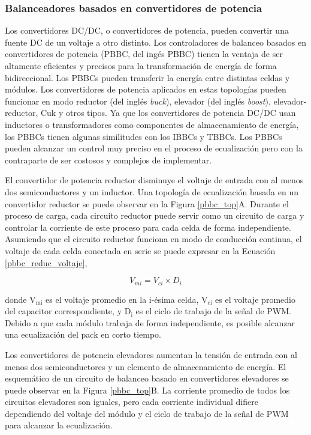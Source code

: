 \subsubsection{Balanceadores basados en convertidores de potencia}

Los convertidores DC/DC, o convertidores de potencia, pueden convertir una fuente
DC de un voltaje a otro distinto. Los controladores de balanceo basados en
convertidores de potencia (\acrshort{PBBC}, del ing\'es \acrlong{PBBC}) tienen
la ventaja de ser altamente eficientes y precisos para la transformaci\'on de
energ\'ia de forma bidireccional. Los \acrshort{PBBC}s pueden transferir la
energ\'ia entre distintas celdas y m\'odulos. Los convertidores de potencia
aplicados en estas topolog\'ias pueden funcionar en modo reductor (del ingl\'es
\emph{buck}), elevador (del ingl\'es \emph{boost}), elevador-reductor, Cuk y
otros tipos. Ya que los convertidores de potencia DC/DC usan inductores o
transformadores como componentes de almacenamiento de energ\'ia, los
\acrshort{PBBC}s tienen algunas similitudes con los \acrshort{IBBC}s y
\acrshort{TBBC}s. Los \acrshort{PBBC}s pueden alcanzar un control muy preciso en 
el proceso de ecualizaci\'on pero con la contraparte de ser costosos y complejos 
de implementar.

El convertidor de potencia reductor disminuye el voltaje de entrada con al menos
dos semiconductores y un inductor. Una topolog\'ia de ecualizaci\'on basada en
un convertidor reductor se puede observar en la Figura \ref{pbbc_top}A. Durante
el proceso de carga, cada circuito reductor puede servir como un circuito de
carga y controlar la corriente de este proceso para cada celda de forma 
independiente. Asumiendo que el circuito reductor funciona en modo de 
conducci\'on continua, el voltaje de cada celda conectada en serie se puede 
expresar en la Ecuaci\'on \ref{pbbc_reduc_voltaje},

\begin{equation}
    V_{mi} = V_{ci} \times D_i \label{pbbc_reduc_voltaje}
\end{equation}

donde $\mathrm{V_{mi}}$ es el voltaje promedio en la i-\'esima celda,
$\mathrm{V_{ci}}$ es el voltaje promedio del capacitor correspondiente, y
$\mathrm{D_i}$ es el ciclo de trabajo de la señal de \acrshort{PWM}. Debido a
que cada m\'odulo trabaja de forma independiente, es posible alcanzar una
ecualizaci\'on del pack en corto tiempo.

Los convertidores de potencia elevadores aumentan la tensi\'on de entrada con
al menos dos semiconductores y un elemento de almacenamiento de energ\'ia. El
esquem\'atico de un circuito de balanceo basado en convertidores elevadores se
puede observar en la Figura \ref{pbbc_top}B. La corriente promedio de todos los
circuitos elevadores son iguales, pero cada corriente individual difiere
dependiendo del voltaje del m\'odulo y el ciclo de trabajo de la señal de
\acrshort{PWM} para alcanzar la ecualizaci\'on.

